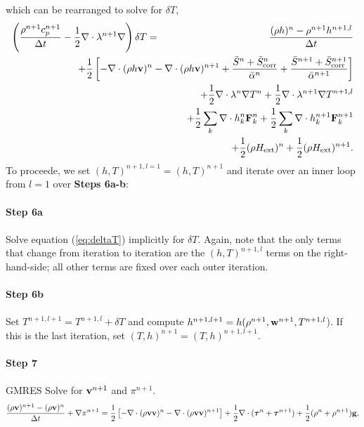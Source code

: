 \documentclass[final]{siamltex}
\def\Fb {{\bf F}}
\def\gb {{\bf g}}
\def\vb {{\bf v}}
\def\wb {{\bf w}}
\def\taub   {\boldsymbol{\tau}}
\def\Hext {H_{\rm ext}}
\def\half   {\frac{1}{2}}
\begin{document}
which can be rearranged to solve for $\delta T$,
\begin{eqnarray}
\left(\frac{\rho^{n+1}c_p^{n+1}}{\Delta t} - \half\nabla\cdot\lambda^{n+1}\nabla\right)\delta T &=& \frac{(\rho h)^n - \rho^{n+1}h^{n+1,l}}{\Delta t}\nonumber\\
&&\hspace{-1.25in} + \half\left[-\nabla\cdot(\rho h\vb)^n - \nabla\cdot(\rho h\vb)^{n+1} + \frac{\bar{S}^n + \bar{S}_{\rm corr}^n}{\bar{\alpha}^n} + \frac{\bar{S}^{n+1} + \bar{S}_{\rm corr}^{n+1}}{\bar{\alpha}^{n+1}}\right]\nonumber\\
&&\hspace{-1.25in} + \half\nabla\cdot\lambda^n\nabla T^n + \half\nabla\cdot\lambda^{n+1}\nabla T^{n+1,l}\nonumber\\
&&\hspace{-1.25in} + \half\sum_k\nabla\cdot h_k^n \Fb_k^n + \half\sum_k\nabla\cdot h_k^{n+1} \Fb_k^{n+1}\nonumber\\
&&\hspace{-1.25in} + \half(\rho\Hext)^n + \half(\rho\Hext)^{n+1}.\label{eq:deltaT}
\end{eqnarray}
To proceede, we set $(h,T)^{n+1,l=1} = (h,T)^{n+1}$ and iterate over an inner 
loop from $l=1$ over {\bf Steps 6a-b}:\\ \\
{\bf Step 6a}\\ \\
Solve equation (\ref{eq:deltaT}) implicitly for $\delta T$.  Again,
note that the only terms that change from iteration to iteration are the
$(h,T)^{n+1,l}$ terms on the right-hand-side; all other terms are fixed over
each outer iteration.\\ \\
{\bf Step 6b}\\ \\
Set $T^{n+1,l+1} = T^{n+1,l} + \delta T$ and compute 
$h^{n+1,l+1} = h(\rho^{n+1},\wb^{n+1},T^{n+1,l}$).  If this is the last iteration, 
set $(T,h)^{n+1} = (T,h)^{n+1,l+1}$.\\ \\
{\bf Step 7}\\ \\
GMRES Solve for $\vb^{n+1}$ and $\pi^{n+1}$.
\begin{equation}
\frac{(\rho\vb)^{n+1} - (\rho\vb)^n}{\Delta t} + \nabla\pi^{n+1} = \half\left[-\nabla\cdot(\rho\vb\vb)^n - \nabla\cdot(\rho\vb\vb)^{n+1}\right] + \frac{1}{2}\nabla\cdot(\taub^n + \taub^{n+1}) + \frac{1}{2}(\rho^n + \rho^{n+1})\gb,
\end{equation}
\end{document}
